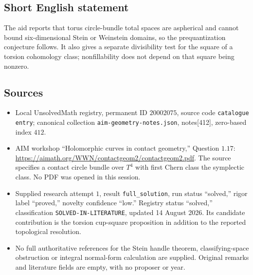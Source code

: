 \documentclass[11pt]{article}
\begin{document}
\subsection{Short English statement}
The aid reports that torus circle-bundle total spaces are aspherical and cannot bound six-dimensional Stein or Weinstein domains, so the prequantization conjecture follows. It also gives a separate divisibility test for the square of a torsion cohomology class; nonfillability does not depend on that square being nonzero.
\subsection{Sources}
\begin{itemize}
\item Local UnsolvedMath registry, permanent ID \(20002075\), source code \texttt{catalogue entry}; canonical collection \texttt{aim-geometry-notes.json}, notes[412], zero-based index \(412\).
\item AIM workshop ``Holomorphic curves in contact geometry,'' Question \(1.17\): \url{https://aimath.org/WWN/contactgeom2/contactgeom2.pdf}. The source specifies a contact circle bundle over \(T^4\) with first Chern class the symplectic class. No PDF was opened in this session.
\item Supplied research attempt \(1\), result \texttt{full\_solution}, run status ``solved,'' rigor label ``proved,'' novelty confidence ``low.'' Registry status ``solved,'' classification \texttt{SOLVED-IN-LITERATURE}, updated 14 August 2026. Its candidate contribution is the torsion cup-square proposition in addition to the reported topological resolution.
\item No full authoritative references for the Stein handle theorem, classifying-space obstruction or integral normal-form calculation are supplied. Original remarks and literature fields are empty, with no proposer or year.
\end{itemize}
\end{document}
